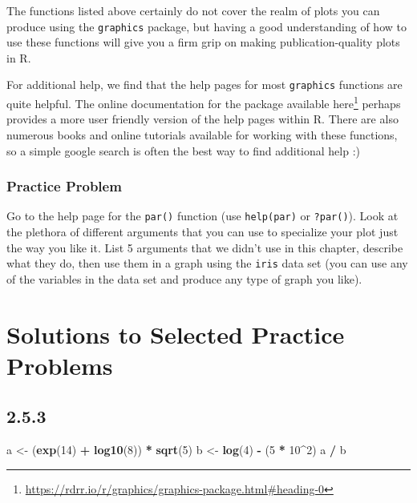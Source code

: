 \documentclass[
]{krantz}
\newenvironment{Shaded}{\begin{snugshade}}{\end{snugshade}}
\newcommand{\DecValTok}[1]{\textcolor[rgb]{0.00,0.00,0.81}{#1}}
\newcommand{\KeywordTok}[1]{\textcolor[rgb]{0.13,0.29,0.53}{\textbf{#1}}}
\newcommand{\NormalTok}[1]{#1}
\newcommand{\OperatorTok}[1]{\textcolor[rgb]{0.81,0.36,0.00}{\textbf{#1}}}
\newcommand{\StringTok}[1]{\textcolor[rgb]{0.31,0.60,0.02}{#1}}
\renewcommand{\href}[2]{#2\footnote{\url{#1}}}
\begin{document}
The functions listed above certainly do not cover the realm of plots you can produce using the \texttt{graphics} package, but having a good understanding of how to use these functions will give you a firm grip on making publication-quality plots in R.

For additional help, we find that the help pages for most \texttt{graphics} functions are quite helpful. The online documentation for the package available \href{https://rdrr.io/r/graphics/graphics-package.html\#heading-0}{here} perhaps provides a more user friendly version of the help pages within R. There are also numerous books and online tutorials available for working with these functions, so a simple google search is often the best way to find additional help :)

\hypertarget{graphics14}{%
\subsection{Practice Problem}\label{graphics14}}

Go to the help page for the \texttt{par()} function (use \texttt{help(par)} or \texttt{?par()}). Look at the plethora of different arguments that you can use to specialize your plot just the way you like it. List 5 arguments that we didn't use in this chapter, describe what they do, then use them in a graph using the \texttt{iris} data set (you can use any of the variables in the data set and produce any type of graph you like).

\hypertarget{solutions-to-selected-practice-problems}{%
\chapter{Solutions to Selected Practice Problems}\label{solutions-to-selected-practice-problems}}

\hypertarget{section}{%
\section*{2.5.3}\label{section}}


\begin{Shaded}
\begin{Highlighting}[]
\NormalTok{a \textless{}{-}}\StringTok{ }\NormalTok{(}\KeywordTok{exp}\NormalTok{(}\DecValTok{14}\NormalTok{) }\OperatorTok{+}\StringTok{ }\KeywordTok{log10}\NormalTok{(}\DecValTok{8}\NormalTok{)) }\OperatorTok{*}\StringTok{ }\KeywordTok{sqrt}\NormalTok{(}\DecValTok{5}\NormalTok{)}
\NormalTok{b \textless{}{-}}\StringTok{ }\KeywordTok{log}\NormalTok{(}\DecValTok{4}\NormalTok{) }\OperatorTok{{-}}\StringTok{ }\NormalTok{(}\DecValTok{5} \OperatorTok{*}\StringTok{ }\DecValTok{10}\OperatorTok{\^{}}\DecValTok{2}\NormalTok{)}
\NormalTok{a }\OperatorTok{/}\StringTok{ }\NormalTok{b}
\end{Highlighting}
\end{Shaded}
\end{document}
